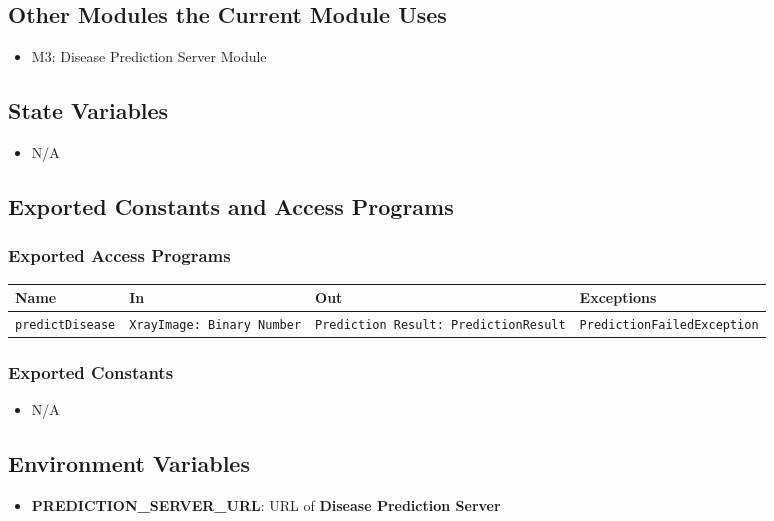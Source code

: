 \documentclass[12pt, titlepage]{article}
\begin{document}
\subsection{Other Modules the Current Module Uses}
\begin{itemize}
    \item M3: Disease Prediction Server Module
\end{itemize}

\subsection{State Variables}
\begin{itemize}
    \item N/A
\end{itemize}

\subsection{Exported Constants and Access Programs}
\subsubsection{Exported Access Programs}
\begin{tabular}{|l|p{3cm}|p{5cm}|p{5.5cm}|}
    \hline
    \textbf{Name} & \textbf{In} & \textbf{Out} & \textbf{Exceptions} \\
    \hline
    \texttt{predictDisease} & \texttt{XrayImage: Binary Number} & \texttt{Prediction Result: PredictionResult} & \texttt{PredictionFailedException} \\
    \hline
\end{tabular}

\subsubsection{Exported Constants}
\begin{itemize}
    \item N/A
\end{itemize}

\subsection{Environment Variables}
\begin{itemize}
  \item \textbf{PREDICTION\_SERVER\_URL}: URL of \textbf{Disease Prediction Server}
\end{itemize}
\end{document}
